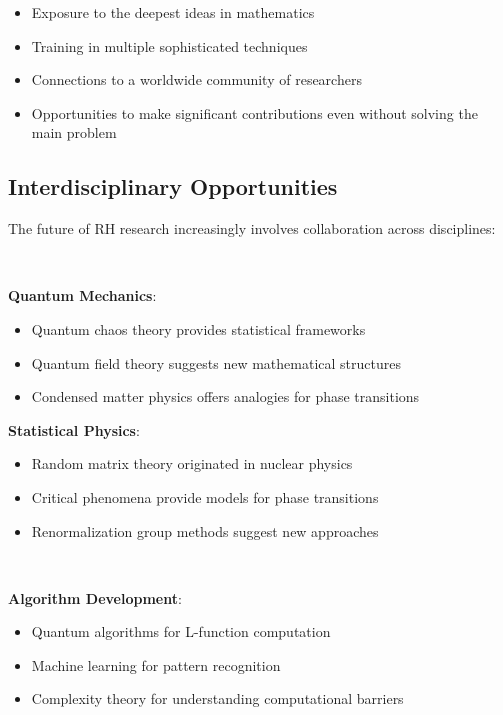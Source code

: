 \begin{itemize}
\item Exposure to the deepest ideas in mathematics
\item Training in multiple sophisticated techniques
\item Connections to a worldwide community of researchers
\item Opportunities to make significant contributions even without solving the main problem
\end{itemize}

\subsection{Interdisciplinary Opportunities}
\label{subsec:interdisciplinary}

The future of RH research increasingly involves collaboration across disciplines:

\begin{collaboration}
~
\end{collaboration}

\noindent\textbf{Quantum Mechanics}: 
\begin{itemize}
\item Quantum chaos theory provides statistical frameworks
\item Quantum field theory suggests new mathematical structures
\item Condensed matter physics offers analogies for phase transitions
\end{itemize}

\textbf{Statistical Physics}:
\begin{itemize}
\item Random matrix theory originated in nuclear physics
\item Critical phenomena provide models for phase transitions
\item Renormalization group methods suggest new approaches
\end{itemize}

\begin{collaboration}
~
\end{collaboration}

\noindent\textbf{Algorithm Development}:
\begin{itemize}
\item Quantum algorithms for L-function computation
\item Machine learning for pattern recognition
\item Complexity theory for understanding computational barriers
\end{itemize}

